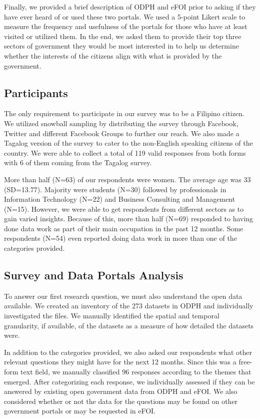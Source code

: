 \documentclass{sigchi}
\begin{document}
Finally, we provided a brief description of ODPH and eFOI prior to asking if they have ever heard of or used these two portals. We used a 5-point Likert scale to measure the frequency and usefulness of the portals for those who have at least visited or utilized them. In the end, we asked them to provide their top three sectors of government they would be most interested in to help us determine whether the interests of the citizens align with what is provided by the government.

\subsection{Participants}
The only requirement to participate in our survey was to be a Filipino citizen. We utilized snowball sampling by distributing the survey through Facebook, Twitter and different Facebook Groups to further our reach. We also made a Tagalog version of the survey to cater to the non-English speaking citizens of the country. We were able to collect a total of 119 valid responses from both forms with 6 of them coming from the Tagalog survey.

More than half (N=63) of our respondents were women. The average age was 33 (SD=13.77). Majority were students (N=30) followed by professionals in Information Technology (N=22) and Business Consulting and Management (N=15). However, we were able to get respondents from different sectors as to gain varied insights. Because of this, more than half (N=69) responded to having done data work as part of their main occupation in the past 12 months. Some respondents (N=54) even reported doing data work in more than one of the categories provided.

\subsection{Survey and Data Portals Analysis}
To answer our first research question, we must also understand the open data available. We created an inventory of the 273 datasets in ODPH and individually investigated the files. We manually identified the spatial and temporal granularity, if available, of the datasets as a measure of how detailed the datasets were. 

In addition to the categories provided, we also asked our respondents what other relevant questions they might have for the next 12 months. Since this was a free-form text field, we manually classified 96 responses according to the themes that emerged. After categorizing each response, we individually assessed if they can be answered by existing open government data from ODPH and eFOI. We also considered whether or not the data for the questions may be found on other government portals or may be requested in eFOI.
\end{document}
